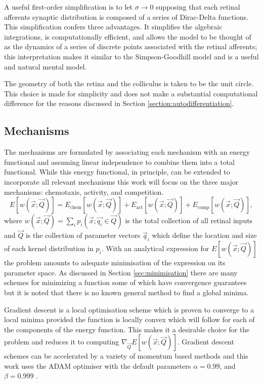 A useful first-order simplification is to let $\sigma\rightarrow0$ supposing that each retinal afferents synaptic distribution is composed of a series of Dirac-Delta functions. This simplification confers three advantages. It simplifies the algebraic integrations, is computationally efficient, and allows the model to be thought of as the dynamics of a series of discrete points associated with the retinal afferents; this interpretation makes it similar to the Simpson-Goodhill model \cite{Simpson2011-zh} and is a useful and natural mental model.

The geometry of both the retina and the colliculus is taken to be the unit circle. This choice is made for simplicity and does not make a substantial computational difference for the reasons discussed in Section \ref{section:autodifferentiation}.
\subsection{Mechanisms}
The mechanisms are formulated by associating each mechanism with an energy functional and assuming linear independence to combine them into a total functional. While this energy functional, in principle, can be extended to incorporate all relevant mechanisms this work will focus on the three major mechanisms: chemotaxis, activity, and competition. 
\begin{equation}
E[w(\vec{x}; \vec{Q})] = E_\text{chem}[w(\vec{x}; \vec{Q})]  + E_\text{act}[w(\vec{x}; \vec{Q})]  + E_\text{comp}[w(\vec{x}; \vec{Q})],
\end{equation}
where $w(\vec{x}; \vec{Q}) = \sum_i p_i(\vec{x}; \vec{q_i} \in \vec{Q})$ is the total collection of all retinal inputs and $\vec{Q}$ is the collection of parameter vectors $\vec{q}_i$ which define the location and size of each kernel distribution in $p_i$. With an analytical expression for $E[w(\vec{x}; \vec{Q})]$ the problem amounts to adequate minimisation of the expression on its parameter space. As discussed in Section \ref{sec:minimisation} there are many schemes for minimizing a function some of which have convergence guarantees but it is noted that there is no known general method to find a global minima. 

Gradient descent is a local optimisation scheme which is proven to converge to a local minima provided the function is locally convex which will follow for each of the components of the energy function. This makes it a desirable choice for the problem and reduces it to computing $\nabla_{\vec{Q}}E[w(\vec{x}; \vec{Q})]$. Gradient descent schemes can be accelerated by a variety of momentum based methods and this work uses the ADAM optimiser with the default parameters $\alpha = 0.99$, and $\beta = 0.999$  \cite{kingma2017adam}. 

